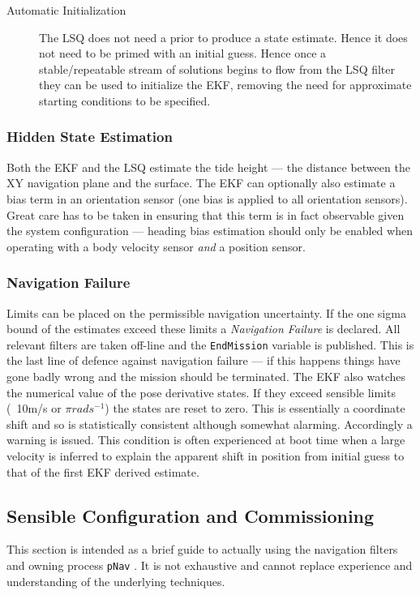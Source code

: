 \documentclass[a4paper,10pt]{article}
\newcommand{\Code}[1]{\texttt{#1} }
\newcommand{\code}[1]{\Code{#1} }
\begin{document}
\begin{description}
\item[Automatic Initialization] The LSQ does not need a prior to
produce a state estimate. Hence it does not need to be primed with
an initial guess. Hence once a stable/repeatable stream of solutions
begins to flow from the LSQ filter they can be used to initialize
the EKF, removing the need  for  approximate starting
conditions to be specified.

\end{description}

\subsubsection{Hidden State Estimation}

Both the EKF and the LSQ estimate the tide height --- the distance
between the XY navigation plane and the surface. The EKF can
optionally also estimate a bias term in an orientation sensor (one
bias is applied to all orientation sensors). Great care has to be
taken in ensuring that this term is in fact observable given the
system configuration --- heading bias estimation should only be
enabled when operating with a body velocity sensor {\em{and}} a
position sensor.


\subsubsection{Navigation Failure}
Limits can be placed on the permissible navigation uncertainty. If
the one sigma bound of the estimates exceed these limits a
{\it{Navigation Failure}} is declared. All relevant filters are
taken off-line and the \code{EndMission} variable is published.
This is the last line of defence against navigation failure --- if
this happens things have gone badly wrong and the mission should
be terminated. The EKF also watches the numerical value of the
pose derivative states. If they exceed sensible limits (~10m/s or
$\pi rads^{-1}$) the states are reset to zero. This is essentially
a coordinate shift and so is statistically consistent although
somewhat alarming. Accordingly a warning is issued. This condition
is often experienced at boot time when a large velocity is
inferred to explain the apparent shift in position from initial
guess to that of the first EKF derived estimate.


\subsection{Sensible Configuration and Commissioning}
This section is intended as a brief guide to actually using the
navigation filters and owning process \code{pNav}. It is not exhaustive and
cannot replace experience and understanding of the underlying
techniques.
\end{document}

